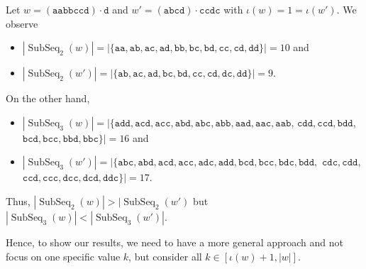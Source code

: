 \documentclass[runningheads,UKenglish,cleveref, autoref, thm-restate]{llncs}
\def\ta{\mathtt{a}}
\def\tb{\mathtt{b}}
\def\tc{\mathtt{c}}
\def\td{\mathtt{d}}
\DeclareMathOperator{\alphabet}{alph}
\DeclareMathOperator\ScatFact{SubSeq}
\DeclareMathOperator\SubWords{SubSeq}
\DeclareMathOperator{\nextAlphPos}{next}
\begin{document}
\else
\begin{example}\label{counterexample}
    Let $w = \mathtt{(aabbccd) \cdot d}$ and $w' = \mathtt{(abcd) \cdot ccdc}$ with $\iota(w) = 1 = \iota(w')$. We observe
    \begin{itemize}
    \item $|\ScatFact_2(w)| = |\{\ta\ta, \ta\tb, \ta\tc, \ta\td, \tb\tb, \tb\tc, \tb\td, \tc\tc, \tc\td, \td\td\}| = 10$
    and
    \item $|\ScatFact_2(w')| = |\{\ta\tb, \ta\tc, \ta\td, \tb\tc, \tb\td, \tc\tc, \tc\td, \td\tc, \td\td\}| = 9$.
    \end{itemize}
    On the other hand, 
    \begin{itemize}
    \item $|\SubWords_3(w)|=|\{\ta\td\td,\ta\tc\td,\ta\tc\tc,
    \ta\tb\td,\ta\tb\tc,\ta\tb\tb,\ta\ta\td,\ta\ta\tc,\ta\ta\tb$, $\tc\td\td,\tc\tc\td,\tb\td\td$, $\tb\tc\td,\tb\tc\tc,\tb\tb\td, \tb\tb\tc\}| = 16$ and
    \item
    $|\ScatFact_3(w')| = |\{\ta\tb\tc,\ta\tb\td,\ta\tc\td,\ta\tc\tc,\ta\td\tc,\ta\td\td,\tb\tc\td,\tb\tc\tc,\tb\td\tc,\tb\td\td,$ 
    $\tc\td\tc,\tc\td\td$, $\tc\tc\td,\tc\tc\tc,\td\tc\tc,\td\tc\td,\td\td\tc\}| = 17$. 
    \end{itemize}
    Thus, $|\ScatFact_2(w)| > |\ScatFact_2(w')$ but $|\ScatFact_3(w)| < |\ScatFact_3(w')|$.
\end{example}

\fi
Hence, to show our results, we need to have a more general approach and not focus on one specific value $k$, but consider all $k\in[\iota(w)+1,|w|]$.
\end{document}
